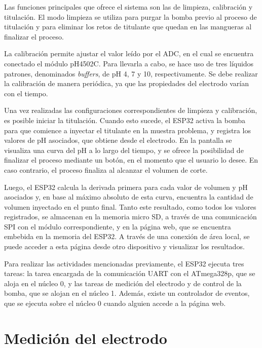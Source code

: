 Las funciones principales que ofrece el sistema son las de limpieza, calibración y titulación. El modo limpieza se utiliza para purgar la bomba previo al proceso de titulación y para eliminar los retos de titulante que quedan en las mangueras al finalizar el proceso. 

La calibración permite ajustar el valor leído por el ADC, en el cual se encuentra conectado el módulo pH4502C. Para llevarla a cabo, se hace uso de tres líquidos patrones, denominados \textit{buffers}, de pH 4, 7 y 10, respectivamente. Se debe realizar la calibración de manera periódica, ya que las propiedades del electrodo varían con el tiempo.

Una vez realizadas las configuraciones correspondientes de limpieza y calibración, es posible iniciar la titulación. Cuando esto sucede, el ESP32 activa  la bomba para que comience a inyectar el titulante en la muestra problema, y registra los valores de pH asociados, que obtiene desde el electrodo. En la pantalla se visualiza una curva del pH a lo largo del tiempo, y se ofrece la posibilidad de finalizar el proceso mediante un botón, en el momento que el usuario lo desee. En caso contrario, el proceso finaliza al alcanzar el volumen de corte.

Luego, el ESP32 calcula la derivada primera para cada valor de volumen y pH asociados y, en base al máximo absoluto de esta curva, encuentra la cantidad de volumen inyectado en el punto final. Tanto este resultado, como todos los valores registrados, se almacenan en la memoria micro SD, a través de una comunicación SPI con el módulo correspondiente, y en la página web, que se encuentra embebida en la memoria del ESP32. A través de una conexión de área local, se puede acceder a esta página desde otro dispositivo y visualizar los resultados.

Para realizar las actividades mencionadas previamente, el ESP32 ejecuta tres tareas: la tarea encargada de la comunicación UART con el ATmega328p, que se aloja en el núcleo 0, y las tareas de medición del electrodo y de control de la bomba, que se alojan en el núcleo 1. Además, existe un controlador de eventos, que se ejecuta sobre el núcleo 0 cuando alguien accede a la página web.


\section{Medición del electrodo}

